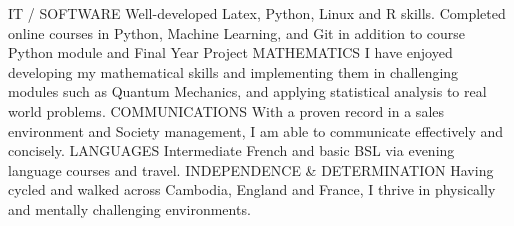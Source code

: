\begin{cvhonors}
  \cvhonor
    {IT / SOFTWARE}
    {Well-developed Latex, Python, Linux  and R skills. Completed online courses in Python, Machine Learning, and Git in addition to course Python module and Final Year Project}
    {}
    {}
  \cvhonor
    {MATHEMATICS}
    {I have enjoyed developing my mathematical skills and implementing them in challenging modules such as Quantum Mechanics, and applying statistical analysis to real world problems.}
    {}
    {}
    \cvhonor
    {COMMUNICATIONS}
    {With a proven record in a sales environment and Society management, I am able to communicate effectively and concisely.}
    {}
    {}
    \cvhonor
    {LANGUAGES}
    {Intermediate French and basic BSL via evening language courses and travel.}
    {}
    {}
    \cvhonor
    {INDEPENDENCE \& DETERMINATION}
    {Having cycled and walked across Cambodia, England and France, I thrive in physically and mentally challenging environments.}
    {}
    {}
\end{cvhonors}
